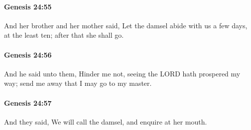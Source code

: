		\paragraph{Genesis 24:55} %
			\label{GENESIS-24-55}

			And her brother and her mother said, Let the damsel abide with us a few days, at the least ten; after that she shall go.


		\paragraph{Genesis 24:56} %
			\label{GENESIS-24-56}

			And he said unto them, Hinder me not, seeing the LORD hath prospered my way; send me away that I may go to my master.


		\paragraph{Genesis 24:57} %
			\label{GENESIS-24-57}

			And they said, We will call the damsel, and enquire at her mouth.


